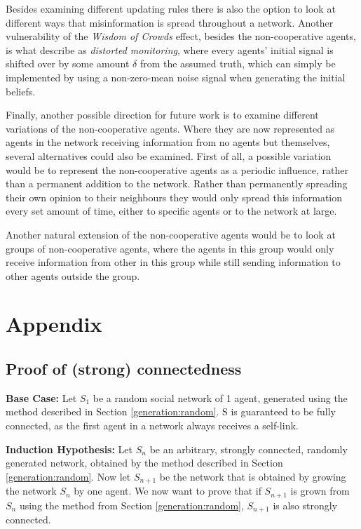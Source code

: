 \documentclass[a4paper, 12pt]{report}
\begin{document}
\noindent Besides examining different updating rules there is also the option to look at different ways that misinformation is spread throughout a network. Another vulnerability of the \emph{Wisdom of Crowds} effect, besides the non-cooperative agents, is what \parencite{amir2021robust} describe as \emph{distorted monitoring}, where every agents' initial signal is shifted over by some amount $\delta$ from the assumed truth, which can simply be implemented by using a non-zero-mean noise signal when generating the initial beliefs.

\noindent Finally, another possible direction for future work is to examine different variations of the non-cooperative agents. Where they are now represented as agents in the network receiving information from no agents but themselves, several alternatives could also be examined. First of all, a possible variation would be to represent the non-cooperative agents as a periodic influence, rather than a permanent addition to the network. Rather than permanently spreading their own opinion to their neighbours they would only spread this information every set amount of time, either to specific agents or to the network at large. 

\noindent Another natural extension of the non-cooperative agents would be to look at groups of non-cooperative agents, where the agents in this group would only receive information from other in this group while still sending information to other agents outside the group.

\newpage

\printbibliography

\newpage

\chapter{Appendix}
\section{Proof of (strong) connectedness}
\label{proof:conn}
\textbf{Base Case:} \newline
Let $S_1$ be a random social network of 1 agent, generated using the method described in Section \ref{generation:random}.
S is guaranteed to be fully connected, as the first agent in a network always receives a self-link.\newline

\textbf{Induction Hypothesis:}\newline
Let $S_n$ be an arbitrary, strongly connected, randomly generated network, obtained by the method described in Section \ref{generation:random}. Now let $S_{n+1}$ be the network that is obtained by growing the network $S_n$ by one agent. We now want to prove that if $S_{n+1}$ is grown from $S_n$ using the method from Section \ref{generation:random}, $S_{n+1}$ is also strongly connected.\newline
\end{document}
